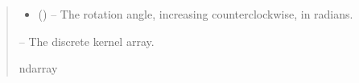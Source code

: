 \documentclass[letterpaper,11pt,english]{sphinxmanual}
\begin{document}
\begin{savenotes}
\begin{fulllineitems}
\begin{quote}
\begin{description}
\begin{itemize}
\item {} 
\sphinxAtStartPar
{} () – The rotation angle, increasing counterclockwise, in radians.

\end{itemize}

\sphinxAtStartPar
{} – The discrete kernel array.

\sphinxAtStartPar
ndarray

\end{description}\end{quote}

\end{fulllineitems}\end{savenotes}

\end{document}
